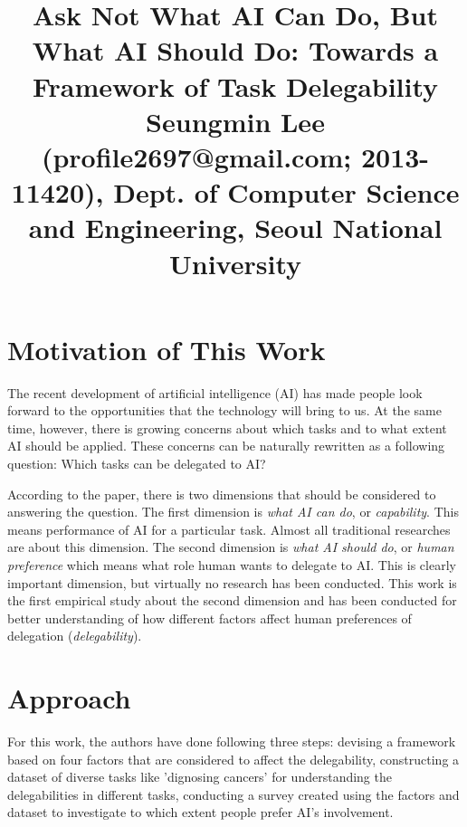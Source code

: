 \documentclass[10pt,twocolumn,letterpaper]{article}
\begin{document}
\title{Ask Not What AI Can Do, But What AI Should Do: Towards a Framework of Task Delegability \\ {\rm {\normalsize Seungmin Lee (profile2697@gmail.com; 2013-11420), Dept. of Computer Science and Engineering, Seoul National University}}}   %

\maketitle
\thispagestyle{empty}


\section{Motivation of This Work}
The recent development of artificial intelligence (AI) has made people look forward to the opportunities that the technology will bring to us. At the same time, however, there is growing concerns about which tasks and to what extent AI should be applied. These concerns can be naturally rewritten as a following question: Which tasks can be delegated to AI? 

According to the paper, there is two dimensions that should be considered to answering the question. The first dimension is \textit{what AI can do}, or \textit{capability}. This means performance of AI for a particular task. Almost all traditional researches are about this dimension. The second dimension is \textit{what AI should do}, or \textit{human preference} which means what role human wants to delegate to AI. This is clearly important dimension, but virtually no research has been conducted. This work is the first empirical study about the second dimension and has been conducted for better understanding of how different factors affect human preferences of delegation (\textit{delegability}). 

\section{Approach}
For this work, the authors have done following three steps: devising a framework based on four factors that are considered to affect the delegability, constructing a dataset of diverse tasks like 'dignosing cancers' for understanding the delegabilities in different tasks, conducting a survey created using the factors and dataset to investigate to which extent people prefer AI's involvement. 
\end{document}
